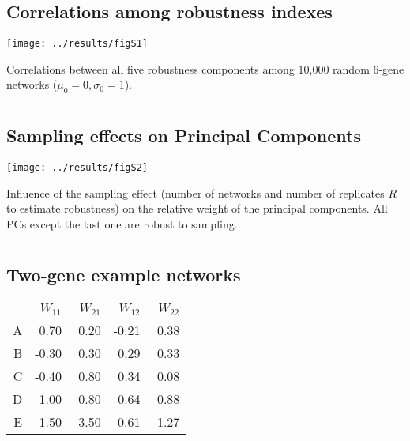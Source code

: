 \documentclass[10pt,a4paper]{article}
\begin{document}
\begin{appendices}
  \setcounter{section}{0}
  \renewcommand{\thesection}{\arabic{section}}

  \clearpage
  \section{}
    \label{supp:fullcorr}
    \subsection*{Correlations among robustness indexes}
	\begin{adjustwidth}{-1in}{0in}
	\begin{flushright}
	\texttt{[image: ../results/figS1]}
	\end{flushright}

	\color{Gray} Correlations between all five robustness components among 10,000 random 6-gene networks ($\mu_0=0, \sigma_0=1$). 
	\end{adjustwidth}

  \clearpage
  \section{}
    \label{supp:PC}
    \subsection*{Sampling effects on Principal Components}
    
	\begin{center}
	\texttt{[image: ../results/figS2]}
	\end{center}    

	{\color{Gray} Influence of the sampling effect (number of networks and number of replicates $R$ to estimate robustness) on the relative
	weight of the principal components. All PCs except the last one are robust to sampling. }


  \clearpage
  \section{}
    \label{supp:W}
    \subsection*{Two-gene example networks}

	\begin{center}
	\begin{tabular}{rrrrr}
	  \hline
	 & $W_{11}$ & $W_{21}$ & $W_{12}$ & $W_{22}$ \\ 
	  \hline
	  A & 0.70 & 0.20 & -0.21 & 0.38 \\ 
	  B & -0.30 & 0.30 & 0.29 & 0.33 \\ 
	  C & -0.40 & 0.80 & 0.34 & 0.08 \\ 
	  D & -1.00 & -0.80 & 0.64 & 0.88 \\ 
	  E & 1.50 & 3.50 & -0.61 & -1.27 \\ 
	   \hline
	\end{tabular}
	\end{center}
	

\end{appendices}
\end{document}
